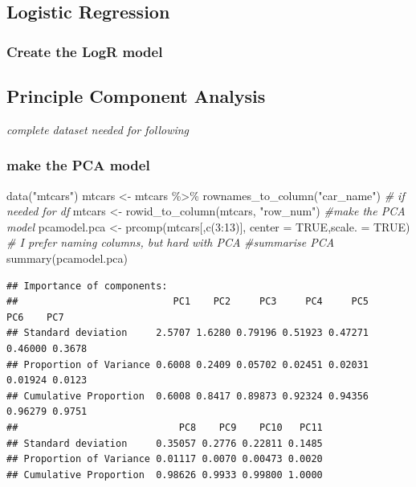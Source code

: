 \documentclass[
]{article}
\newenvironment{Shaded}{\begin{snugshade}}{\end{snugshade}}
\newcommand{\AttributeTok}[1]{\textcolor[rgb]{0.77,0.63,0.00}{#1}}
\newcommand{\CommentTok}[1]{\textcolor[rgb]{0.56,0.35,0.01}{\textit{#1}}}
\newcommand{\ConstantTok}[1]{\textcolor[rgb]{0.00,0.00,0.00}{#1}}
\newcommand{\DecValTok}[1]{\textcolor[rgb]{0.00,0.00,0.81}{#1}}
\newcommand{\FunctionTok}[1]{\textcolor[rgb]{0.00,0.00,0.00}{#1}}
\newcommand{\NormalTok}[1]{#1}
\newcommand{\OtherTok}[1]{\textcolor[rgb]{0.56,0.35,0.01}{#1}}
\newcommand{\SpecialCharTok}[1]{\textcolor[rgb]{0.00,0.00,0.00}{#1}}
\newcommand{\StringTok}[1]{\textcolor[rgb]{0.31,0.60,0.02}{#1}}
\begin{document}
\hypertarget{logistic-regression}{%
\subsection{Logistic Regression}\label{logistic-regression}}

\hypertarget{create-the-logr-model}{%
\subsubsection{Create the LogR model}\label{create-the-logr-model}}

\hypertarget{principle-component-analysis}{%
\subsection{Principle Component Analysis}\label{principle-component-analysis}}

\emph{complete dataset needed for following}

\hypertarget{make-the-pca-model}{%
\subsubsection{make the PCA model}\label{make-the-pca-model}}

\begin{Shaded}
\begin{Highlighting}[]
\FunctionTok{data}\NormalTok{(}\StringTok{"mtcars"}\NormalTok{)}
\NormalTok{mtcars }\OtherTok{\textless{}{-}}\NormalTok{ mtcars }\SpecialCharTok{\%\textgreater{}\%} \FunctionTok{rownames\_to\_column}\NormalTok{(}\StringTok{"car\_name"}\NormalTok{) }\CommentTok{\# if needed for df}
\NormalTok{mtcars }\OtherTok{\textless{}{-}} \FunctionTok{rowid\_to\_column}\NormalTok{(mtcars, }\StringTok{"row\_num"}\NormalTok{)}
\CommentTok{\#make the PCA model}
\NormalTok{pcamodel.pca }\OtherTok{\textless{}{-}} \FunctionTok{prcomp}\NormalTok{(mtcars[,}\FunctionTok{c}\NormalTok{(}\DecValTok{3}\SpecialCharTok{:}\DecValTok{13}\NormalTok{)], }\AttributeTok{center =} \ConstantTok{TRUE}\NormalTok{,}\AttributeTok{scale. =} \ConstantTok{TRUE}\NormalTok{) }\CommentTok{\# I prefer naming columns, but hard with PCA}
\CommentTok{\#summarise PCA}
\FunctionTok{summary}\NormalTok{(pcamodel.pca)}
\end{Highlighting}
\end{Shaded}

\begin{verbatim}
## Importance of components:
##                           PC1    PC2     PC3     PC4     PC5     PC6    PC7
## Standard deviation     2.5707 1.6280 0.79196 0.51923 0.47271 0.46000 0.3678
## Proportion of Variance 0.6008 0.2409 0.05702 0.02451 0.02031 0.01924 0.0123
## Cumulative Proportion  0.6008 0.8417 0.89873 0.92324 0.94356 0.96279 0.9751
##                            PC8    PC9    PC10   PC11
## Standard deviation     0.35057 0.2776 0.22811 0.1485
## Proportion of Variance 0.01117 0.0070 0.00473 0.0020
## Cumulative Proportion  0.98626 0.9933 0.99800 1.0000
\end{verbatim}
\end{document}
